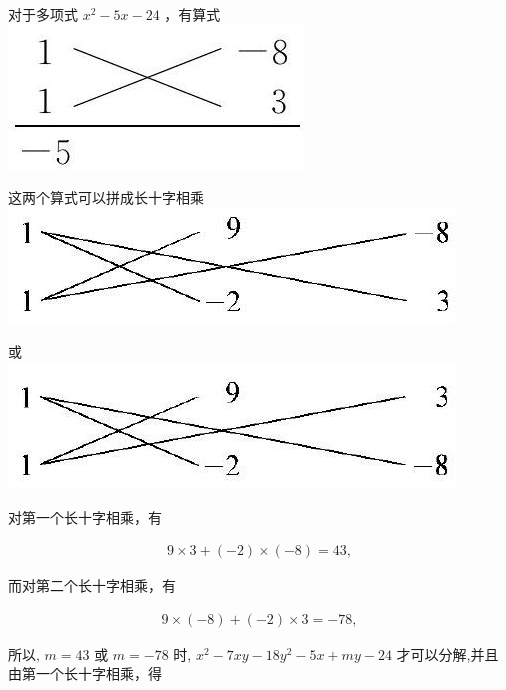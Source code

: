 \documentclass[10pt]{article}
\begin{document}
对于多项式 $x^{2}-5 x-24$ ，有算式\\
\includegraphics[max width=\textwidth, center]{2024_10_30_bd799899fef40368a068g-045}

这两个算式可以拼成长十字相乘\\
\includegraphics[max width=\textwidth, center]{2024_10_30_bd799899fef40368a068g-045(3)}

或\\
\includegraphics[max width=\textwidth, center]{2024_10_30_bd799899fef40368a068g-045(1)}

对第一个长十字相乘，有

\begin{align*}
9 \times 3+(-2) \times(-8)=43,
\end{align*}

而对第二个长十字相乘，有

\begin{align*}
9 \times(-8)+(-2) \times 3=-78,
\end{align*}

所以, $m=43$ 或 $m=-78$ 时, $x^{2}-7 x y-18 y^{2}-5 x+m y-24$ 才可以分解,并且由第一个长十字相乘，得
\end{document}

